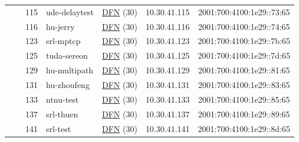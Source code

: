 \begin{small}
\begin{center}
\begin{longtable}{|c|c|c|c|c|c|c|c|}
  &  & \tiny{115} & \multicolumn{1}{|l|}{\tiny{ude-delaytest}} & \multicolumn{2}{|c|}{\tiny{\href{https://www.dfn.de}{DFN} (30)}} & \tiny{10.30.41.115} & \tiny{2001:700:4100:1e29::73:65} \\* \cline{3-3}\cline{4-4}\cline{5-5}\cline{6-6}\cline{7-7}\cline{8-8}
  &  & \tiny{116} & \multicolumn{1}{|l|}{\tiny{hu-jerry}} & \multicolumn{2}{|c|}{\tiny{\href{https://www.dfn.de}{DFN} (30)}} & \tiny{10.30.41.116} & \tiny{2001:700:4100:1e29::74:65} \\* \cline{3-3}\cline{4-4}\cline{5-5}\cline{6-6}\cline{7-7}\cline{8-8}
  &  & \tiny{123} & \multicolumn{1}{|l|}{\tiny{srl-mptcp}} & \multicolumn{2}{|c|}{\tiny{\href{https://www.dfn.de}{DFN} (30)}} & \tiny{10.30.41.123} & \tiny{2001:700:4100:1e29::7b:65} \\* \cline{3-3}\cline{4-4}\cline{5-5}\cline{6-6}\cline{7-7}\cline{8-8}
  &  & \tiny{125} & \multicolumn{1}{|l|}{\tiny{tuda-sereon}} & \multicolumn{2}{|c|}{\tiny{\href{https://www.dfn.de}{DFN} (30)}} & \tiny{10.30.41.125} & \tiny{2001:700:4100:1e29::7d:65} \\* \cline{3-3}\cline{4-4}\cline{5-5}\cline{6-6}\cline{7-7}\cline{8-8}
  &  & \tiny{129} & \multicolumn{1}{|l|}{\tiny{hu-multipath}} & \multicolumn{2}{|c|}{\tiny{\href{https://www.dfn.de}{DFN} (30)}} & \tiny{10.30.41.129} & \tiny{2001:700:4100:1e29::81:65} \\* \cline{3-3}\cline{4-4}\cline{5-5}\cline{6-6}\cline{7-7}\cline{8-8}
  &  & \tiny{131} & \multicolumn{1}{|l|}{\tiny{hu-zhoufeng}} & \multicolumn{2}{|c|}{\tiny{\href{https://www.dfn.de}{DFN} (30)}} & \tiny{10.30.41.131} & \tiny{2001:700:4100:1e29::83:65} \\* \cline{3-3}\cline{4-4}\cline{5-5}\cline{6-6}\cline{7-7}\cline{8-8}
  &  & \tiny{133} & \multicolumn{1}{|l|}{\tiny{ntnu-test}} & \multicolumn{2}{|c|}{\tiny{\href{https://www.dfn.de}{DFN} (30)}} & \tiny{10.30.41.133} & \tiny{2001:700:4100:1e29::85:65} \\* \cline{3-3}\cline{4-4}\cline{5-5}\cline{6-6}\cline{7-7}\cline{8-8}
  &  & \tiny{137} & \multicolumn{1}{|l|}{\tiny{srl-thuen}} & \multicolumn{2}{|c|}{\tiny{\href{https://www.dfn.de}{DFN} (30)}} & \tiny{10.30.41.137} & \tiny{2001:700:4100:1e29::89:65} \\* \cline{3-3}\cline{4-4}\cline{5-5}\cline{6-6}\cline{7-7}\cline{8-8}
  &  & \tiny{141} & \multicolumn{1}{|l|}{\tiny{srl-test}} & \multicolumn{2}{|c|}{\tiny{\href{https://www.dfn.de}{DFN} (30)}} & \tiny{10.30.41.141} & \tiny{2001:700:4100:1e29::8d:65} \\* \cline{3-3}\cline{4-4}\cline{5-5}\cline{6-6}\cline{7-7}\cline{8-8}

\end{longtable}
\end{center}
\end{small}
